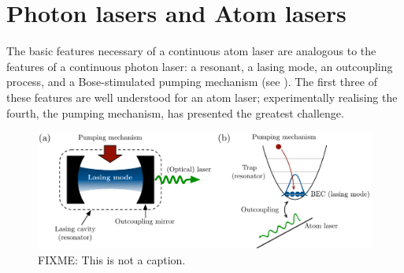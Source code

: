 

\section{Photon lasers and Atom lasers}
\label{Introduction:PhotonAndAtomLasers}

The basic features necessary of a continuous atom laser are analogous to the features of a continuous photon laser: a resonant, a lasing mode, an outcoupling process, and a Bose-stimulated pumping mechanism (see ).  The first three of these features are well understood for an atom laser; experimentally realising the fourth, the pumping mechanism, has presented the greatest challenge.

\begin{figure}
    \centering
    \includegraphics[width=14cm]{LaserAtomLaserComparison}
    \caption{
        \label{Introduction:LaserAtomLaserComparison}
        FIXME: This is not a caption.
    }
\end{figure}


